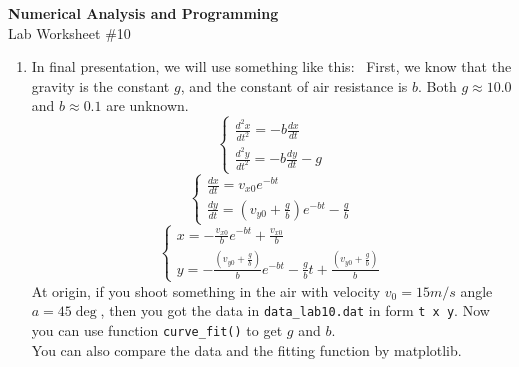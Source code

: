 \documentclass[12pt]{article}
\begin{document}
\begin{center}
\Large
\textbf{Numerical Analysis and Programming}\\
\large
Lab Worksheet \#10\\

\end{center}

\begin{enumerate}
\item In final presentation, we will use something like this: \
First, we know that the gravity is the constant $g$, and the constant of air resistance is $b$. Both $g\approx10.0$ and $b\approx0.1$ are unknown. 
\begin{equation}
\left\{\begin{array}{ll}\frac{d^2x}{dt^2}=-b\frac{dx}{dt}\\
						\frac{d^2y}{dt^2}=-b\frac{dy}{dt}-g
	   \end{array} \right.
\end{equation}
\begin{equation}
\left\{\begin{array}{ll}\frac{dx}{dt}=v_{x0}e^{-bt}\\
						\frac{dy}{dt}=(v_{y0}+\frac{g}{b})e^{-bt}-\frac{g}{b}
	   \end{array} \right.
\end{equation}
\begin{equation}
\left\{\begin{array}{ll}x=-\frac{v_{x0}}{b}e^{-bt}+\frac{v_{x0}}{b}\\
						y=-\frac{(v_{y0}+\frac{g}{b})}{b}e^{-bt}-\frac{g}{b}t+\frac{(v_{y0}+\frac{g}{b})}{b}
	   \end{array} \right.
\end{equation}
At origin, if you shoot something in the air with velocity $v_0=15m/s$ angle $a=45\deg$, then you got the data in \verb'data_lab10.dat' in form \verb't x y'. Now you can use function \verb'curve_fit()' to get $g$ and $b$.\\
You can also compare the data and the fitting function by matplotlib.
%
%	
%
\end{enumerate}
\end{document}
